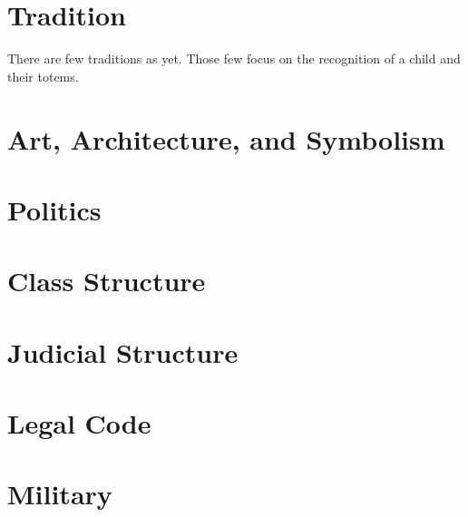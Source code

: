 \section{Tradition}

There are few traditions as yet. Those few focus on the recognition of
a child and their totems.

\section{Art, Architecture, and Symbolism}

\section{Politics}


\section{Class Structure}

\section{Judicial Structure}

\section{Legal Code}

\section{Military}

